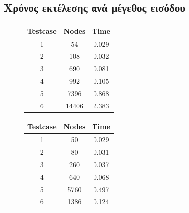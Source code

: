 \documentclass[a4paper,9pt]{article}
\begin{document}

\subsection{Χρόνος εκτέλεσης ανά μέγεθος εισόδου}

\begin{figure}[H]
    \centering
    \begin{minipage}{0.4\textwidth}
        \begin{tabular}{| c | c | c |}
            \hline
            Testcase & Nodes & Time \\
            \hline
            \hline
            1 & 54 & 0.029\\
         2 & 108 & 0.032\\
         3 & 690 & 0.081\\
         4 & 992 & 0.105\\
         5 & 7396 & 0.868\\
         6 & 14406 & 2.383\\
            \hline
        \end{tabular}
    \end{minipage}
    \begin{minipage}{0.4\textwidth}
        \begin{tabular}{| c | c | c |}
            \hline
            Testcase & Nodes & Time \\
            \hline
            \hline
            1 & 50 & 0.029\\
         2 & 80 & 0.031\\
         3 & 260 & 0.037\\
         4 & 640 & 0.068\\
         5 & 5760 & 0.497\\
         6 & 1386 & 0.124\\
            \hline
        \end{tabular}
    \end{minipage}
\end{figure}
\end{document}
